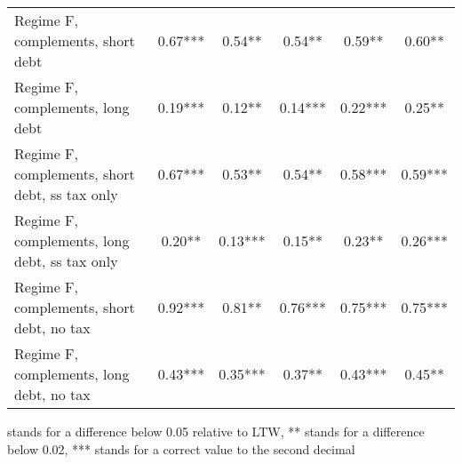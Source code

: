 \documentclass[letterpaper,12pt]{article}%
\begin{document}
\begin{table}[H]
\begin{threeparttable}
\begin{tabular}{l c c c c c}
     \quad Regime F, complements, short debt &  0.67*** & 0.54**  &  0.54** & 0.59** & 0.60**  \\
     \quad Regime F, complements, long debt &   0.19*** & 0.12** & 0.14*** & 0.22***  & 0.25** \\
     \quad Regime F, complements, short debt, ss tax only &  0.67*** & 0.53** & 0.54**  & 0.58*** & 0.59*** \\
     \quad Regime F, complements, long debt, ss tax only &  0.20**  & 0.13*** & 0.15**  & 0.23**  &  0.26*** \\
     \quad Regime F, complements, short debt, no tax &  0.92*** & 0.81**   & 0.76***  & 0.75***  & 0.75*** \\
     \quad Regime F, complements, long debt, no tax &   0.43*** & 0.35*** & 0.37**  & 0.43*** & 0.45** \\
    \bottomrule    
    \end{tabular}
    \begin{tablenotes}
    \item * stands for a difference below 0.05 relative to LTW, ** stands for a difference below 0.02, *** stands for a correct value to the second decimal
    \end{tablenotes}
    \label{tab:my_label}
    \end{threeparttable}
\end{table}
\end{document}
